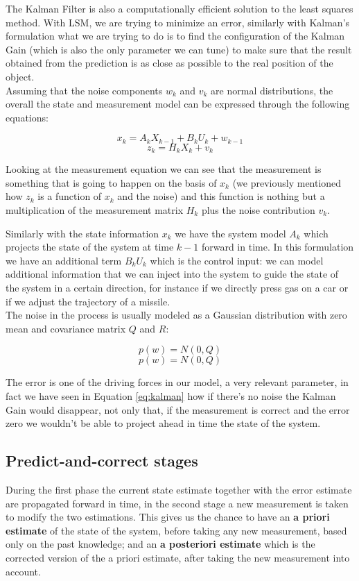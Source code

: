 The Kalman Filter is also a computationally efficient solution to the least squares method. With LSM, we are trying to minimize an error, similarly with Kalman's formulation what we are trying to do is to find the configuration of the Kalman Gain (which is also the only parameter we can tune) to make sure that the result obtained from the prediction is as close as possible to the real position of the object.
\\

Assuming that the noise components $w_k$ and $v_k$ are normal distributions, the overall the state and measurement model can be expressed through the following equations:

\[
    x_k = A_kX_{k-1}+B_kU_k+w_{k-1}    
\]
\[
    z_k = H_kX_k+v_k   
\]

Looking at the measurement equation we can see that the measurement is something that is going to happen on the basis of $x_k$ (we previously mentioned how $z_k$ is a function of $x_k$ and the noise) and this function is nothing but a multiplication of the measurement matrix $H_k$ plus the noise contribution $v_k$.

Similarly with the state information $x_k$ we have the system model $A_k$ which projects the state of the system at time $k-1$ forward in time. In this formulation we have an additional term $B_kU_k$ which is the control input: we can model additional information that we can inject into the system to guide the state of the system in a certain direction, for instance if we directly press gas on a car or if we adjust the trajectory of a missile.
\\

The noise in the process is usually modeled as a Gaussian distribution with zero mean and covariance matrix $Q$ and $R$:

\[
    p(w) = N(0, Q)
\]
\[
    p(w) = N(0, Q)
\]

The error is one of the driving forces in our model, a very relevant parameter, in fact we have seen in Equation \ref{eq:kalman} how if there's no noise the Kalman Gain would disappear, not only that, if the measurement is correct and the error zero we wouldn't be able to project ahead in time the state of the system.

\subsection{Predict-and-correct stages}

During the first phase the current state estimate together with the error estimate are propagated forward in time, in the second stage a new measurement is taken to modify the two estimations.
This gives us the chance to have an \textbf{a priori estimate} of the state of the system, before taking any new measurement, based only on the past knowledge; and an \textbf{a posteriori estimate} which is the corrected version of the a priori estimate, after taking the new measurement into account.
\\

